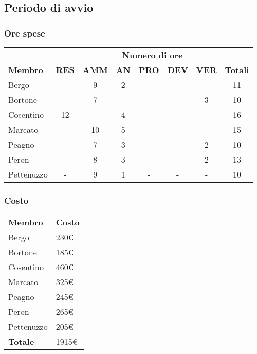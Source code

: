 \subsection{Periodo di avvio}
	\subsubsection{Ore spese}
		\begin{tabular}{| l | c c c c c c | c |}
			\rowcolor{LightBlue}
			& \multicolumn{7}{c}{\textbf{\color{white}Numero di ore}}	\\
	
			\rowcolor{LightBlue}
			\textbf{\color{white}Membro}
			& \textbf{\color{white}RES}
			& \textbf{\color{white}AMM}
			& \textbf{\color{white}AN}
			& \textbf{\color{white}PRO}
			& \textbf{\color{white}DEV}
			& \textbf{\color{white}VER}
			& \textbf{\color{white}Totali}\\
	
			Bergo     & - & 9 & 2 & - & - & - & 11\\
			Bortone   & - & 7 & - & - & - & 3 & 10\\
			Cosentino & 12 & - & 4 & - & - & - & 16\\
			Marcato   & - & 10 & 5 & - & - & - & 15\\
			Peagno    & - & 7 & 3 & - & - & 2 & 10\\
			Peron     & - & 8 & 3 & - & - & 2 & 13\\
			Pettenuzzo & - & 9 & 1 & - & - & - & 10\\ \hline
		\end{tabular}
	\subsubsection{Costo}
		\begin{tabular}{| l | l |}
			\rowcolor{LightBlue}
			\textbf{\color{white}Membro}
			& \textbf{\color{white}Costo}\\
			
			Bergo & 230€\\
			Bortone & 185€\\
			Cosentino & 460€\\
			Marcato & 325€\\
			Peagno & 245€\\
			Peron & 265€\\
			Pettenuzzo & 205€\\ \hline
			\textbf{Totale} & 1915€\\ \hline
		\end{tabular}